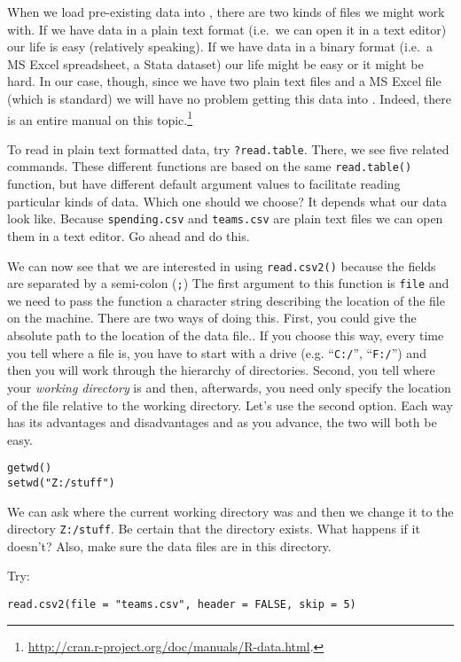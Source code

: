 When we load pre-existing data into \R{}, there are two kinds of files
we might work with. If we have data in a plain text format (i.e.\ we
can open it in a text editor) our life is easy (relatively
speaking). If we have data in a binary format (i.e.\ a MS Excel
spreadsheet, a Stata dataset) our life might be easy or it might be
hard. In our case, though, since we have two plain text files and a MS
Excel file (which is standard) we will have no problem getting this
data into \R{}. Indeed, there is an entire manual on this
topic.\footnote{\url{http://cran.r-project.org/doc/manuals/R-data.html}.}

To read in plain text formatted data, try \texttt{?read.table}. There,
we see five related commands. These different functions are based on
the same \texttt{read.table()} function, but have different default
argument values to facilitate reading particular kinds of data. Which
one should we choose? It depends what our data look like. Because
\texttt{spending.csv} and \texttt{teams.csv} are plain text files we
can open them in a text editor. Go ahead and do this. 

We can now see that we are interested in using \texttt{read.csv2()}
because the fields are separated by a semi-colon (\texttt{;}) The
first argument to this function is \texttt{file} and we need to pass
the function a character string describing the location of the file on
the machine. There are two ways of doing this. First, you could give
\R{} the absolute path to the location of the data file.. If you
choose this way, every time you tell \R{} where a file is, you have to
start with a drive (e.g. ``\texttt{C:/}'', ``\texttt{F:/}'') and then
you will work through the hierarchy of directories. Second, you tell
\R{} where your \textit{working directory} is and then, afterwards,
you need only specify the location of the file relative to the working
directory. Let's use the second option. Each way has its advantages
and disadvantages and as you advance, the two will both be easy.

\begin{verbatim}
getwd()
setwd("Z:/stuff")
\end{verbatim}

We can ask \R{} where the current working directory was and then we
change it to the directory \texttt{Z:/stuff}. Be certain that the
directory exists. What happens if it doesn't?  Also, make sure the
data files are in this directory.

Try:
\begin{verbatim}
read.csv2(file = "teams.csv", header = FALSE, skip = 5)
\end{verbatim}

